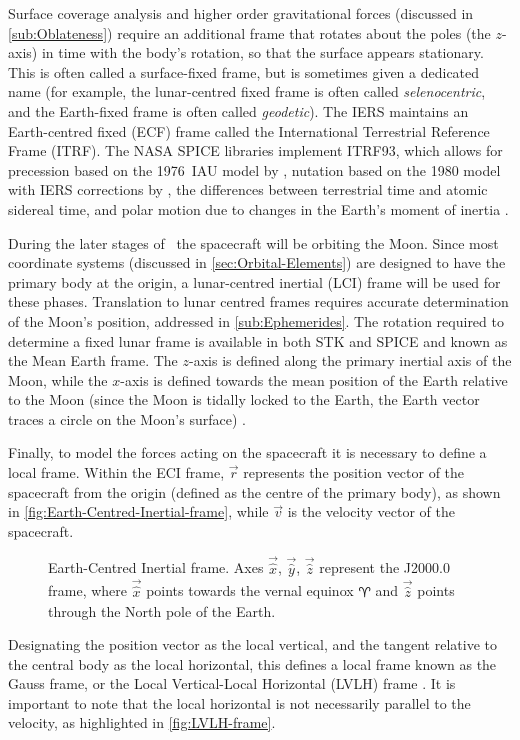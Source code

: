 Surface coverage analysis and higher order gravitational forces (discussed in \autoref{sub:Oblateness}) require an additional frame that rotates about the poles (the $z$-axis) in time with the body's rotation, so that the surface appears stationary. This is often called a surface-fixed frame, but is sometimes given a dedicated name (for example, the lunar-centred fixed frame is often called \emph{selenocentric}, and the Earth-fixed frame is often called \emph{geodetic}). The IERS maintains an Earth-centred fixed (ECF) frame called the International Terrestrial Reference Frame (ITRF). The NASA SPICE libraries implement ITRF93, which allows for precession based on the 1976~IAU model by \textcite{Lieske1977}, nutation based on the 1980 model with IERS corrections by \textcite{Herring1986}, the differences between terrestrial time and atomic sidereal time, and polar motion due to changes in the Earth's moment of inertia \parencite{Montenbruck2000}.

During the later stages of \BW\ the spacecraft will be orbiting the Moon. Since most coordinate systems (discussed in \autoref{sec:Orbital-Elements}) are designed to have the primary body at the origin, a lunar-centred inertial (LCI) frame will be used for these phases. Translation to lunar centred frames requires accurate determination of the Moon's position, addressed in \autoref{sub:Ephemerides}. The rotation required to determine a fixed lunar frame is available in both STK and SPICE and known as the Mean Earth frame. The $z$-axis is defined along the primary inertial axis of the Moon, while the $x$-axis is defined towards the mean position of the Earth relative to the Moon (since the Moon is tidally locked to the Earth, the Earth vector traces a circle on the Moon's surface) \parencite{LCF}.

Finally, to model the forces acting on the spacecraft it is necessary to define a local frame. Within the ECI frame, $\vec{r}$ represents the position vector of the spacecraft from the origin (defined as the centre of the primary body), as shown in \autoref{fig:Earth-Centred-Inertial-frame}, while $\vec{v}$ is the velocity vector of the spacecraft.
\begin{figure}
\centering
\def\svgwidth{\figurewidth}

\caption{Earth-Centred Inertial frame. Axes $\vec{\hat{x}}$, $\vec{\hat{y}}$, $\vec{\hat{z}}$ represent the J2000.0 frame, where $\vec{\hat{x}}$ points towards the vernal equinox $\Aries$ and $\vec{\hat{z}}$ points through the North pole of the Earth.%
} \label{fig:Earth-Centred-Inertial-frame}
\end{figure}
Designating the position vector as the local vertical, and the tangent relative to the central body as the local horizontal, this defines a local frame known as the Gauss frame, or the Local Vertical-Local Horizontal (LVLH) frame \parencite{STK}. It is important to note that the local horizontal is not necessarily parallel to the velocity, as highlighted in \autoref{fig:LVLH-frame}.

